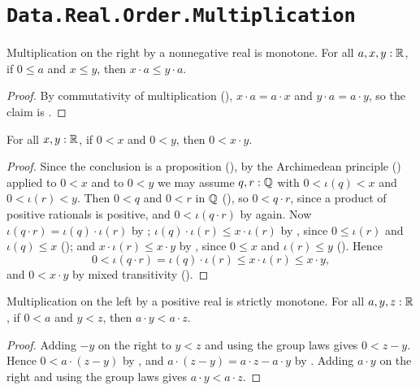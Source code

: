 \section{\texttt{Data.Real.Order.Multiplication}}


\begin{corollary}
  \label{mulMonoRLeReal}
  Multiplication on the right by a nonnegative real is monotone. For all $a, x, y : \mathbb{R}$, if $0 \le a$ and $x \le y$, then $x \cdot a \le y \cdot a$.
\end{corollary}
\begin{proof}
  By commutativity of multiplication (), $x \cdot a = a \cdot x$ and $y \cdot a = a \cdot y$, so the claim is .
\end{proof}

\begin{lemma}[\agda{0<·}]
  \label{mulPosReal}
  For all $x, y : \mathbb{R}$, if $0 < x$ and $0 < y$, then $0 < x \cdot y$.
\end{lemma}
\begin{proof}
  Since the conclusion is a proposition (), by the Archimedean principle () applied to $0 < x$ and to $0 < y$ we may assume $q, r : \mathbb{Q}$ with $0 < \iota(q) < x$ and $0 < \iota(r) < y$. Then $0 < q$ and $0 < r$ in $\mathbb{Q}$ (), so $0 < q \cdot r$, since a product of positive rationals is positive, and $0 < \iota(q \cdot r)$ by  again. Now $\iota(q \cdot r) = \iota(q) \cdot \iota(r)$ by ; $\iota(q) \cdot \iota(r) \le x \cdot \iota(r)$ by , since $0 \le \iota(r)$ and $\iota(q) \le x$ (); and $x \cdot \iota(r) \le x \cdot y$ by , since $0 \le x$ and $\iota(r) \le y$ (). Hence
  \[
    0 < \iota(q \cdot r) = \iota(q) \cdot \iota(r) \le x \cdot \iota(r) \le x \cdot y,
  \]
  and $0 < x \cdot y$ by mixed transitivity ().
\end{proof}

\begin{lemma}
  \label{mulMonoLLtReal}
  Multiplication on the left by a positive real is strictly monotone. For all $a, y, z : \mathbb{R}$, if $0 < a$ and $y < z$, then $a \cdot y < a \cdot z$.
\end{lemma}
\begin{proof}
  Adding $-y$ on the right to $y < z$ and using the group laws gives $0 < z - y$. Hence $0 < a \cdot (z - y)$ by , and $a \cdot (z - y) = a \cdot z - a \cdot y$ by . Adding $a \cdot y$ on the right and using the group laws gives $a \cdot y < a \cdot z$.
\end{proof}

